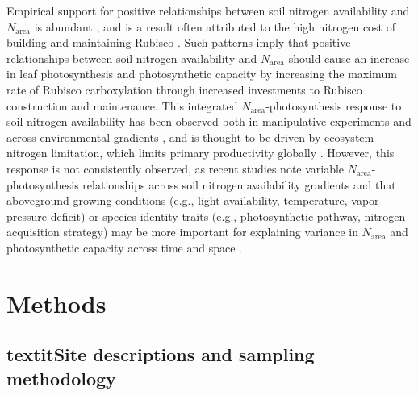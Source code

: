 Empirical support for positive relationships between soil nitrogen availability and $N_\mathrm{area}$ is abundant , and is a result often attributed to the high nitrogen cost of building and maintaining Rubisco . Such patterns imply that positive relationships between soil nitrogen availability and $N_\mathrm{area}$ should cause an increase in leaf photosynthesis and photosynthetic capacity by increasing the maximum rate of Rubisco carboxylation through increased investments to Rubisco construction and maintenance. This integrated $N_\mathrm{area}$-photosynthesis response to soil nitrogen availability has been observed both in manipulative experiments and across environmental gradients , and is thought to be driven by ecosystem nitrogen limitation, which limits primary productivity globally . However, this response is not consistently observed, as recent studies note variable $N_\mathrm{area}$-photosynthesis relationships across soil nitrogen availability gradients  and that aboveground growing conditions (e.g., light availability, temperature, vapor pressure deficit) or species identity traits (e.g., photosynthetic pathway, nitrogen acquisition strategy) may be more important for explaining variance in $N_\mathrm{area}$ and photosynthetic capacity across time and space .

\section{Methods}

\subsection{textit{Site descriptions and sampling methodology}}

